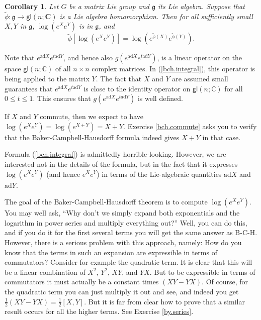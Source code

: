 \documentclass{amsbook}
\let \frak = \mathfrak
\theoremstyle{plain}
\newtheorem{corollary}[theorem]{Corollary}
\numberwithin{equation}{chapter}
\numberwithin{theorem}{chapter}
\begin{document}
\begin{corollary}
\label{local.homo}Let $G$ be a matrix Lie group and $\frak{g}$ its Lie
algebra. Suppose that $\widetilde{\phi}:\frak{g}\rightarrow\mathsf{gl}%
(n;\mathbf{C})$ is a Lie algebra homomorphism. Then for all sufficiently small
$X,Y$ in $\frak{g}$, $\log\left(  e^{X}e^{Y}\right)  $ is in $\frak{g}$, and
\begin{equation}
\widetilde{\phi}\left[  \log\left(  e^{X}e^{Y}\right)  \right]  =\log\left(
e^{\widetilde{\phi}(X)}e^{\widetilde{\phi}(Y)}\right)  \text{.}\label{switch2}%
\end{equation}
\end{corollary}

Note that $e^{\mathrm{ad}X}e^{t\mathrm{ad}Y}$, and hence also
$g(e^{\mathrm{ad}X}e^{t\mathrm{ad}Y})$, is a linear operator on the space
$\mathsf{gl}(n;\mathbb{C})$ of all $n\times n$ complex matrices. In
(\ref{bch.integral}), this operator is being applied to the matrix $Y$. The
fact that $X$ and $Y$ are assumed small guarantees that $e^{\mathrm{ad}%
X}e^{t\mathrm{ad}Y}$ is close to the identity operator on $\mathsf{gl}%
(n;\mathbb{C})$ for all $0\leq t\leq1$. This ensures that $g(e^{\mathrm{ad}%
X}e^{t\mathrm{ad}Y})$ is well defined.

If $X$ and $Y$ commute, then we expect to have $\log\left(  e^{X}e^{Y}\right)
=\log(e^{X+Y})=X+Y$. Exercise \ref{bch.commute} asks you to verify that the
Baker-Campbell-Hausdorff formula indeed gives $X+Y$ in that case.

Formula (\ref{bch.integral}) is admittedly horrible-looking. However, we are
interested not in the details of the formula, but in the fact that it
expresses $\log\left(  e^{X}e^{Y}\right)  $ (and hence $e^{X}e^{Y}$) in terms
of the Lie-algebraic quantities $\mathrm{ad}X$ and $\mathrm{ad}Y$.

The goal of the Baker-Campbell-Hausdorff theorem is to compute $\log\left(
e^{X}e^{Y}\right)  $. You may well ask, ``Why don't we simply expand both
exponentials and the logarithm in power series and multiply everything out?''
Well, you can do this, and if you do it for the first several terms you will
get the same answer as B-C-H. However, there is a serious problem with this
approach, namely: How do you know that the terms in such an expansion are
expressible in terms of commutators? Consider for example the quadratic term.
It is clear that this will be a linear combination of $X^{2}$, $Y^{2}$, $XY$,
and $YX$. But to be expressible in terms of commutators it must actually be a
constant times $\left(  XY-YX\right)  $. Of course, for the quadratic term you
can just multiply it out and see, and indeed you get $\frac12\left(
XY-YX\right)  =\frac12\left[  X,Y\right]  $. But it is far from clear how to
prove that a similar result occurs for all the higher terms. See Exercise
\ref{by.series}.
\end{document}
